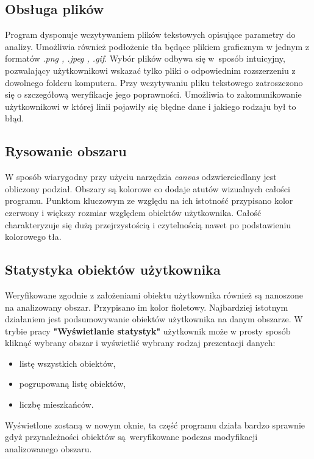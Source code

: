 \documentclass[a4paper,11pt]{article}
\begin{document}
\subsection{Obsługa plików}
Program dysponuje wczytywaniem plików tekstowych opisujące parametry do analizy. Umożliwia również podłożenie tła będące plikiem graficznym w jednym z formatów \textit{.png , .jpeg , .gif}. Wybór plików odbywa się w~sposób intuicyjny, pozwalający użytkownikowi wskazać tylko pliki o odpowiednim rozszerzeniu z dowolnego folderu komputera. Przy wczytywaniu pliku tekstowego zatroszczono się o szczegółową weryfikacje jego poprawności. Umożliwia to zakomunikowanie użytkownikowi w której linii pojawiły się błędne dane i jakiego rodzaju był to błąd.
\subsection{Rysowanie obszaru}
W sposób wiarygodny przy użyciu narzędzia \textit{canvas} odzwierciedlany jest obliczony podział. Obszary są kolorowe co dodaje atutów wizualnych całości programu. Punktom kluczowym ze względu na ich istotność przypisano kolor czerwony i większy rozmiar względem obiektów użytkownika. Całość charakteryzuje się dużą przejrzystością i czytelnością nawet po podstawieniu kolorowego tła.
\subsection{Statystyka obiektów użytkownika}
Weryfikowane zgodnie z założeniami obiektu użytkownika również są nanoszone na analizowany obszar. Przypisano im kolor fioletowy. Najbardziej istotnym działaniem jest podsumowywanie obiektów użytkownika na danym obszarze. W trybie pracy \textbf{"Wyświetlanie statystyk"} użytkownik może w prosty sposób kliknąć wybrany obszar i wyświetlić wybrany rodzaj prezentacji danych:
\begin{itemize}
\item listę wszystkich obiektów,
\item pogrupowaną listę obiektów,
\item liczbę mieszkańców.
\end{itemize}
Wyświetlone zostaną w nowym oknie, ta część programu działa bardzo sprawnie gdyż przynależności obiektów są~weryfikowane podczas modyfikacji analizowanego obszaru.
\end{document}
